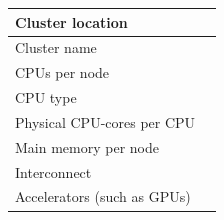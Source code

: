 \documentclass[whitelistedextension,showhints]{nhrproposal}
\begin{document}
\BenchmarkSystem
\begin{center}
\begin{tabular}{|G{5cm}|L{10cm}|}\hline
Cluster location &  \\ \hline
Cluster name & \\ \hline
CPUs per node & \\ \hline
CPU type & \\ \hline
Physical CPU-cores per CPU & \\ \hline
Main memory per node & \\ \hline
Interconnect & \\ \hline
Accelerators (such as GPUs) & \\ \hline
\end{tabular}
\end{center}

\BenchmarkData

\BenchmarkDiscussion

%




\ResourceJustification

\end{document}
